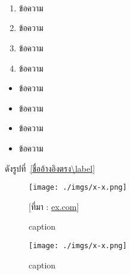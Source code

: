 \pagebreak

\\

\chapter{}

\section{}

\subsection{}

\subsubsection{}

\textbf{}

\underline{}

\begin{enumerate}
  \item ข้อความ
  \item ข้อความ
  \item ข้อความ
  \item ข้อความ
\end{enumerate}

\begin{itemize}
  \item ข้อความ
  \item ข้อความ
  \item ข้อความ
  \item ข้อความ
\end{itemize}


ดังรูปที่~\ref{ชื่ออ้างอิงตรง\label}


\begin{figure}[H]\centering
    \setlength{\fboxrule}{0.2mm}  %
    \setlength{\fboxsep}{1cm}     %
    \fbox{}                       %
    \texttt{[image: ./imgs/x-x.png]}
    \caption{caption}\label{fig:x-x}
    \small [ที่มา : \url{ex.com}]
\end{figure}

\begin{figure}[H]\centering
    \texttt{[image: ./imgs/x-x.png]}
    \caption{caption}\label{fig:x-x}
\end{figure}

